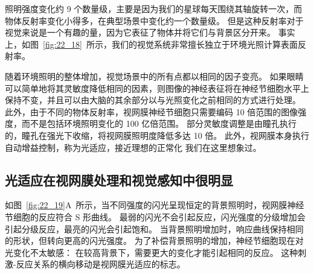 照明强度变化约 9 个数量级，主要是因为我们的星球每天围绕其轴旋转一次，而物体反射率变化小得多，在典型场景中变化约一个数量级。
但是这种反射率对于视觉来说是一个有趣的量，因为它表征了物体并将它们与背景区分开来。
事实上，如图~\ref{fig:22_18}~所示，我们的视觉系统非常擅长独立于环境光照计算表面反射率。


随着环境照明的整体增加，视觉场景中的所有点都以相同的因子变亮。
如果眼睛可以简单地将其灵敏度降低相同的因素，则图像的神经表征将在神经节细胞水平上保持不变，并且可以由大脑的其余部分以与光照变化之前相同的方式进行处理。 
此外，由于不同的物体反射率，视网膜神经节细胞只需要编码 10 倍范围的图像强度，而不是包括环境照明变化的 100 亿倍范围。
部分灵敏度调整是由瞳孔执行的，瞳孔在强光下收缩，将视网膜照明度降低多达 10 倍。
此外，视网膜本身执行自动增益控制，称为光适应，接近理想的正常化 我们在这里想象过。



\subsection{光适应在视网膜处理和视觉感知中很明显}

如图~\ref{fig:22_19}A~所示，当不同强度的闪光呈现恒定的背景照明时，视网膜神经节细胞的反应符合 S 形曲线。
最弱的闪光不会引起反应，闪光强度的分级增加会引起分级反应，最亮的闪光会引起饱和。
当背景照明增加时，响应曲线保持相同的形状，但转向更高的闪光强度。
为了补偿背景照明的增加，神经节细胞现在对光变化不太敏感：
在较高背景下，需要更大的变化才能引起相同的反应。
这种刺激-反应关系的横向移动是视网膜光适应的标志。


